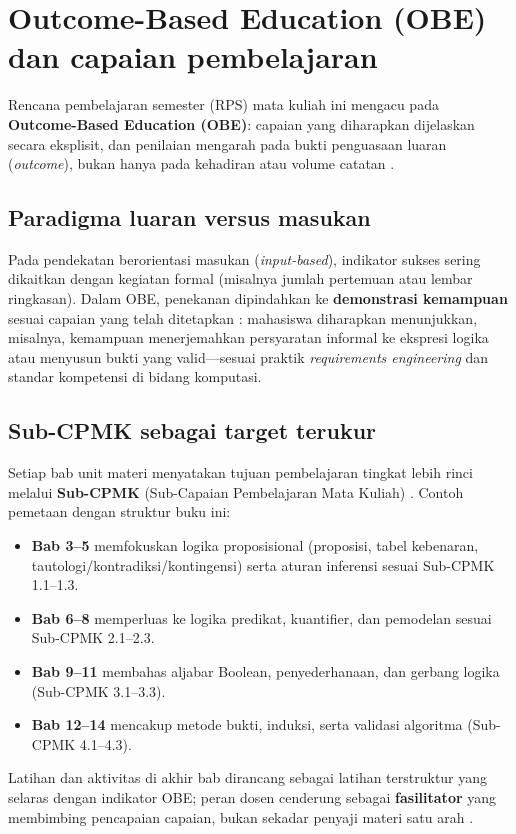\section{Outcome-Based Education (OBE) dan capaian pembelajaran}

Rencana pembelajaran semester (RPS) mata kuliah ini mengacu pada \textbf{Outcome-Based Education (OBE)}: capaian yang diharapkan dijelaskan secara eksplisit, dan penilaian mengarah pada bukti penguasaan luaran (\textit{outcome}), bukan hanya pada kehadiran atau volume catatan \cite{spady1994,obe_springer2024}.

\subsection{Paradigma luaran versus masukan}

Pada pendekatan berorientasi masukan (\textit{input-based}), indikator sukses sering dikaitkan dengan kegiatan formal (misalnya jumlah pertemuan atau lembar ringkasan). Dalam OBE, penekanan dipindahkan ke \textbf{demonstrasi kemampuan} sesuai capaian yang telah ditetapkan \cite{spady1994}: mahasiswa diharapkan menunjukkan, misalnya, kemampuan menerjemahkan persyaratan informal ke ekspresi logika atau menyusun bukti yang valid---sesuai praktik \textit{requirements engineering} dan standar kompetensi di bidang komputasi.

\subsection{Sub-CPMK sebagai target terukur}

Setiap bab unit materi menyatakan tujuan pembelajaran tingkat lebih rinci melalui \textbf{Sub-CPMK} (Sub-Capaian Pembelajaran Mata Kuliah) \cite{in4obe}. Contoh pemetaan dengan struktur buku ini:

\begin{itemize}
  \item \textbf{Bab 3--5} memfokuskan logika proposisional (proposisi, tabel kebenaran, tautologi/kontradiksi/kontingensi) serta aturan inferensi sesuai Sub-CPMK 1.1--1.3.
  \item \textbf{Bab 6--8} memperluas ke logika predikat, kuantifier, dan pemodelan sesuai Sub-CPMK 2.1--2.3.
  \item \textbf{Bab 9--11} membahas aljabar Boolean, penyederhanaan, dan gerbang logika (Sub-CPMK 3.1--3.3).
  \item \textbf{Bab 12--14} mencakup metode bukti, induksi, serta validasi algoritma (Sub-CPMK 4.1--4.3).
\end{itemize}

Latihan dan aktivitas di akhir bab dirancang sebagai latihan terstruktur yang selaras dengan indikator OBE; peran dosen cenderung sebagai \textbf{fasilitator} yang membimbing pencapaian capaian, bukan sekadar penyaji materi satu arah \cite{obe_springer2024,benari_matlogic}.
